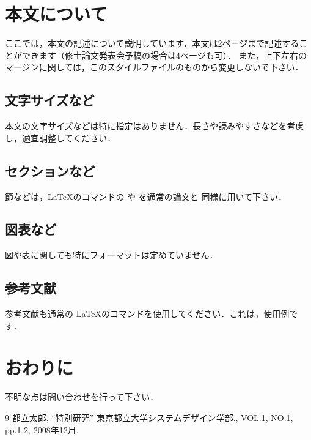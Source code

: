 \documentclass[a4paper]{ltjsarticle}
\begin{document}
\section{本文について}
ここでは，本文の記述について説明しています．本文は2ページまで記述することができます（修士論文発表会予稿の場合は4ページも可）．
また，上下左右のマージンに関しては，このスタイルファイルのものから変更しないで下さい．

\subsection{文字サイズなど}
本文の文字サイズなどは特に指定はありません．長さや読みやすさなどを考慮し，適宜調整してください．
\subsection{セクションなど}
節などは，\LaTeX のコマンドの  や  を通常の論文と
同様に用いて下さい．

\subsection{図表など}
図や表に関しても特にフォーマットは定めていません．

\subsection{参考文献}
参考文献も通常の \LaTeX のコマンドを使用してください．これは，使用例です\cite{tarou1}．
\section{おわりに}
不明な点は問い合わせを行って下さい．

\begin{thebibliography}{9}\footnotesize
{} 都立太郎, ``特別研究'' 東京都立大学システムデザイン学部., VOL.1, NO.1,
	 pp.1-2, 2008年12月.

\end{thebibliography}
%
\end{document}
